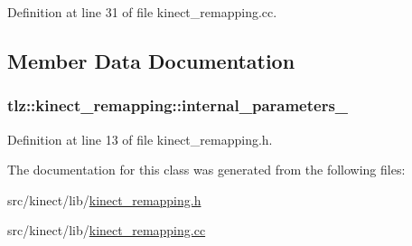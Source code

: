 Definition at line 31 of file kinect\+\_\+remapping.\+cc.



\subsection{Member Data Documentation}
\subsubsection[{\texorpdfstring{internal\+\_\+parameters\+\_\+}{internal_parameters_}}]{ tlz\+::kinect\+\_\+remapping\+::internal\+\_\+parameters\+\_\+\hspace{0.3cm}{\ttfamily [protected]}}\hypertarget{classtlz_1_1kinect__remapping_a18032d6bb860fda0a2313818963b4ef6}{}\label{classtlz_1_1kinect__remapping_a18032d6bb860fda0a2313818963b4ef6}


Definition at line 13 of file kinect\+\_\+remapping.\+h.



The documentation for this class was generated from the following files\+:\begin{DoxyCompactItemize}
\item 
src/kinect/lib/\hyperlink{kinect__remapping_8h}{kinect\+\_\+remapping.\+h}\item 
src/kinect/lib/\hyperlink{kinect__remapping_8cc}{kinect\+\_\+remapping.\+cc}\end{DoxyCompactItemize}
